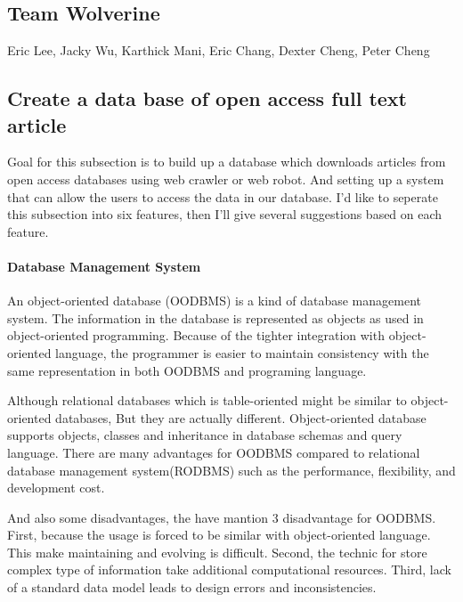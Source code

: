 	
\subsection*{Team Wolverine}
\label{Group}
	
Eric Lee, Jacky Wu, Karthick Mani, Eric Chang, Dexter Cheng, Peter Cheng
	
\subsection*{Create a data base of open access full text article}
\label{task1}

Goal for this subsection is to build up a database which downloads articles from open access databases using web crawler or web robot. And setting up a system that can allow the users to access the data in our database. I'd like to seperate this subsection into six features, then I'll give several suggestions based on each feature. 

\paragraph*{Database Management System}
\label{task1:part0}
An object-oriented database (OODBMS) is a kind of database management system.\cite{WiKiauthor2013} The information in the database is represented as objects as used in object-oriented programming.
Because of the tighter integration with object-oriented language, the programmer is easier to maintain consistency with the same representation in both OODBMS and programing language.

Although relational databases which is table-oriented might be similar to object-oriented databases, But they are actually different. Object-oriented database supports objects, classes and inheritance in database schemas and query language.
There are many advantages for OODBMS compared to relational database management system(RODBMS) such as the performance, flexibility, and development cost.

And also some disadvantages, the \cite{Systems2010} have mantion 3 disadvantage for OODBMS. First, because the usage is forced to be similar with object-oriented language. This make maintaining and evolving is  difficult. Second, the technic for store complex type of information take additional computational resources. Third, lack of a standard data model leads to design errors and inconsistencies.



